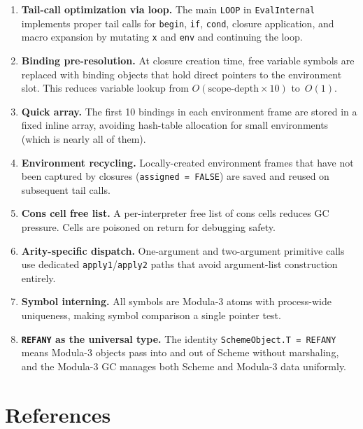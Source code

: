 \documentclass[12pt]{report}
\begin{document}
\begin{enumerate}
\item \textbf{Tail-call optimization via loop.}  The main \texttt{LOOP}
  in \texttt{EvalInternal} implements proper tail calls for
  \texttt{begin}, \texttt{if}, \texttt{cond}, closure application,
  and macro expansion by mutating \texttt{x} and \texttt{env} and
  continuing the loop.

\item \textbf{Binding pre-resolution.}  At closure creation time, free
  variable symbols are replaced with binding objects that hold direct
  pointers to the environment slot.  This reduces variable lookup from
  $O(\text{scope-depth} \times 10)$ to~$O(1)$.

\item \textbf{Quick array.}  The first 10 bindings in each environment
  frame are stored in a fixed inline array, avoiding hash-table
  allocation for small environments (which is nearly all of them).

\item \textbf{Environment recycling.}  Locally-created environment
  frames that have not been captured by closures (\texttt{assigned =
  FALSE}) are saved and reused on subsequent tail calls.

\item \textbf{Cons cell free list.}  A per-interpreter free list of
  cons cells reduces GC pressure.  Cells are poisoned on return for
  debugging safety.

\item \textbf{Arity-specific dispatch.}  One-argument and two-argument
  primitive calls use dedicated \texttt{apply1}/\texttt{apply2} paths
  that avoid argument-list construction entirely.

\item \textbf{Symbol interning.}  All symbols are Modula-3 atoms with
  process-wide uniqueness, making symbol comparison a single pointer
  test.

\item \textbf{\texttt{REFANY} as the universal type.}  The identity
  \texttt{SchemeObject.T = REFANY} means Modula-3 objects pass into
  and out of Scheme without marshaling, and the Modula-3 GC manages
  both Scheme and Modula-3 data uniformly.
\end{enumerate}

\chapter*{References}
\end{document}
